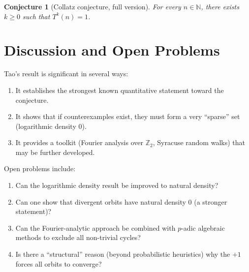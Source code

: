 \documentclass[12pt,a4paper]{article}
\newtheorem{conjecture}[theorem]{Conjecture}
\begin{document}
\begin{conjecture}[Collatz conjecture, full version]\label{conj:full}
For every $n \in \mathbb{N}$, there exists $k \geq 0$ such that $T^k(n) = 1$.
\end{conjecture}

\section{Discussion and Open Problems}

Tao's result is significant in several ways:
\begin{enumerate}
  \item It establishes the strongest known quantitative statement toward the conjecture.
  \item It shows that if counterexamples exist, they must form a very ``sparse'' set
        (logarithmic density 0).
  \item It provides a toolkit (Fourier analysis over $\mathbb{Z}_2$, Syracuse random walks)
        that may be further developed.
\end{enumerate}

Open problems include:
\begin{enumerate}
  \item Can the logarithmic density result be improved to natural density?
  \item Can one show that divergent orbits have natural density 0 (a stronger statement)?
  \item Can the Fourier-analytic approach be combined with $p$-adic algebraic methods
        to exclude all non-trivial cycles?
  \item Is there a ``structural'' reason (beyond probabilistic heuristics) why the
        $+1$ forces all orbits to converge?
\end{enumerate}
\end{document}
